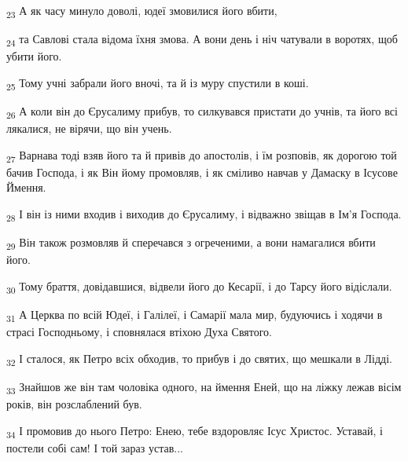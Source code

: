 \begin{tcolorbox}
\textsubscript{23} А як часу минуло доволі, юдеї змовилися його вбити,
\end{tcolorbox}
\begin{tcolorbox}
\textsubscript{24} та Савлові стала відома їхня змова. А вони день і ніч чатували в воротях, щоб убити його.
\end{tcolorbox}
\begin{tcolorbox}
\textsubscript{25} Тому учні забрали його вночі, та й із муру спустили в коші.
\end{tcolorbox}
\begin{tcolorbox}
\textsubscript{26} А коли він до Єрусалиму прибув, то силкувався пристати до учнів, та його всі лякалися, не вірячи, що він учень.
\end{tcolorbox}
\begin{tcolorbox}
\textsubscript{27} Варнава тоді взяв його та й привів до апостолів, і їм розповів, як дорогою той бачив Господа, і як Він йому промовляв, і як сміливо навчав у Дамаску в Ісусове Ймення.
\end{tcolorbox}
\begin{tcolorbox}
\textsubscript{28} І він із ними входив і виходив до Єрусалиму, і відважно звіщав в Ім'я Господа.
\end{tcolorbox}
\begin{tcolorbox}
\textsubscript{29} Він також розмовляв й сперечався з огреченими, а вони намагалися вбити його.
\end{tcolorbox}
\begin{tcolorbox}
\textsubscript{30} Тому браття, довідавшися, відвели його до Кесарії, і до Тарсу його відіслали.
\end{tcolorbox}
\begin{tcolorbox}
\textsubscript{31} А Церква по всій Юдеї, і Галілеї, і Самарії мала мир, будуючись і ходячи в страсі Господньому, і сповнялася втіхою Духа Святого.
\end{tcolorbox}
\begin{tcolorbox}
\textsubscript{32} І сталося, як Петро всіх обходив, то прибув і до святих, що мешкали в Лідді.
\end{tcolorbox}
\begin{tcolorbox}
\textsubscript{33} Знайшов же він там чоловіка одного, на ймення Еней, що на ліжку лежав вісім років, він розслаблений був.
\end{tcolorbox}
\begin{tcolorbox}
\textsubscript{34} І промовив до нього Петро: Енею, тебе вздоровляє Ісус Христос. Уставай, і постели собі сам! І той зараз устав...
\end{tcolorbox}
